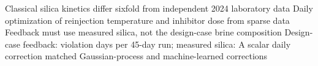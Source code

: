 Classical silica kinetics differ sixfold from independent 2024 laboratory data
Daily optimization of reinjection temperature and inhibitor dose from sparse data
Feedback must use measured silica, not the design-case brine composition
Design-case feedback:  violation days per 45-day run; measured silica: 
A scalar daily correction matched Gaussian-process and machine-learned corrections
